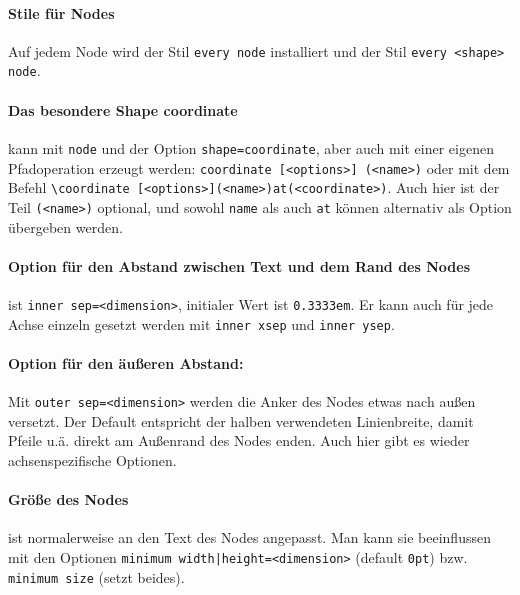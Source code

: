 \documentclass[a4paper,ngerman,10pt]{scrartcl}
\begin{document}
\paragraph*{Stile für Nodes}
Auf jedem Node wird der Stil \texttt{every node} installiert und der Stil \texttt{every <shape> node}.

\paragraph*{Das besondere Shape coordinate}
kann mit \texttt{node}  und der Option \texttt{shape=coordinate}, aber auch mit einer eigenen Pfadoperation erzeugt werden: \texttt{coordinate [<options>] (<name>)} oder mit dem Befehl \verb!\!\texttt{coordinate [<options>](<name>)at(<coordinate>)}. Auch hier ist der Teil \texttt{(<name>)} optional, und sowohl \texttt{name} als auch \texttt{at} können alternativ als Option übergeben werden.

\paragraph*{Option für den Abstand zwischen Text und dem Rand des Nodes}
ist \texttt{inner sep=<dimension>}, initialer Wert ist \texttt{0.3333em}. Er kann auch für jede Achse einzeln gesetzt werden mit \texttt{inner xsep} und \texttt{inner ysep}.

\paragraph*{Option für den äußeren Abstand:}
Mit \texttt{outer sep=<dimension>} werden die Anker des Nodes etwas nach außen versetzt. Der Default entspricht der halben verwendeten Linienbreite, damit Pfeile u.ä. direkt am Außenrand des Nodes enden. Auch hier gibt es wieder achsenspezifische Optionen.

\paragraph*{Größe des Nodes}
ist normalerweise an den Text des Nodes angepasst. Man kann sie beeinflussen mit den Optionen \texttt{minimum width|height=<dimension>} (default \texttt{0pt}) bzw. \texttt{minimum size} (setzt beides).
\end{document}
